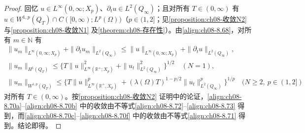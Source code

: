 \documentclass[../../main.tex]{subfiles}%
\begin{document}
\begin{proof}
回忆 $u\in L^\infty(0,\infty;X_p)$、$\partial_t u\in L^2(Q_\infty)$；且对所有 $T\in(0,\infty)$ 有 $u\in W^{1,p}(Q_T)\cap C([0,\infty);L^p(\Omega))$（$p\in(1,2]$；见\cref{proposition:ch08-收敛N2} 与\cref{proposition:ch08-收敛N1} 及\cref{theorem:ch08-存在性}）。由\eqref{align:ch08-8.68}，对所有 $m\in\mathbb{N}$ 有
\begin{align}
\|u_m\|_{L^\infty(0,\infty;X_p)}+\|\partial_t u_m\|_{L^2(Q_\infty)}
\leqslant\|u\|_{L^\infty(0,\infty;X_p)}+\|\partial_t u\|_{L^2(Q_\infty)}, \label{align:ch08-8.71}\\
\|u_m\|_{H^1(Q_T)}\leqslant\{T\|u\|^2_{L^\infty(\mathbb{R}^+;X_p)}+\|u_t\|^2_{L^2(Q_\infty)}\}^{1/2}\quad(N=1), \label{align:ch08-8.72}\\
\|u_m\|_{W^{1,p}(Q_T)}\leqslant\{T\|u\|^p_{L^\infty(\mathbb{R}^+,X_p)}+(\lambda(\Omega)T)^{1-p/2}\|u_t\|^p_{L^2(Q_\infty)}\}^{1/p}\quad(N\geqslant2,\ p\in(1,2]) \label{align:ch08-8.73}
\end{align}
对所有 $T\in(0,\infty)$。按\cref{proposition:ch08-收敛N2} 证明中的论证，\eqref{align:ch08-8.70a}--\eqref{align:ch08-8.70b} 中的收敛由不等式\eqref{align:ch08-8.72}--\eqref{align:ch08-8.73} 得到，而\eqref{align:ch08-8.70c}--\eqref{align:ch08-8.70f} 中的收敛由不等式\eqref{align:ch08-8.71} 得到。结论即得。
\end{proof}
\end{document}
